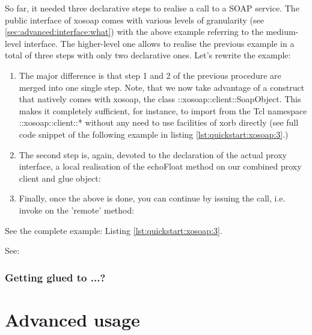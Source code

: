 So far, it needed three declarative steps to realise a call to a SOAP service. The public interface of xosoap comes with various levels of granularity (see \ref{sec:advanced:interface:what}) with the above example referring to the medium-level interface. The higher-level one allows to realise the previous example in a total of three steps with only two declarative ones. Let's rewrite the example:

\begin{enumerate}
\item The major difference is that step 1 and 2 of the previous procedure are merged into one single step. Note, that we now take advantage of a construct that natively comes with xosoap, the class ::xosoap::client::SoapObject. This makes it completely sufficient, for instance, to import from the Tcl namespace ::xosoap::client::* without any need to use facilities of xorb directly (see full code snippet of the following example in listing \ref{lst:quickstart:xosoap:3}.)

\item The second step is, again, devoted to the declaration of the actual proxy interface, a local realisation of the echoFloat method on our combined proxy client and glue object:

\item Finally, once the above is done, you can continue by issuing the call, i.e. invoke on the 'remote' method:

\end{enumerate}

 \begin{hints}
\item See the complete example: Listing \ref{lst:quickstart:xosoap:3}.
\item See: 
\end{hints}

  
  \subsubsection{Getting glued to ...?}
  \section{Advanced usage}\label{sec:advanced}
